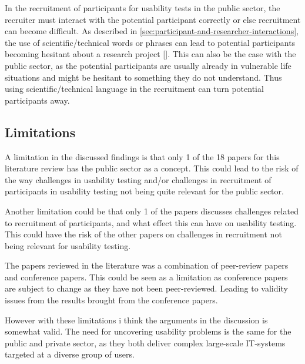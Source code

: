 In the recruitment of participants for usability tests in the public sector, the recruiter must interact with the potential participant correctly or else recruitment can become difficult. As described in \autoref{sec:participant-and-researcher-interactions}, the use of scientific/technical words or phrases can lead to potential participants becoming hesitant about a research project [\cite{pkf_2018}]. This can also be the case with the public sector, as the potential participants are usually already in vulnerable life situations and might be hesitant to something they do not understand. Thus using scientific/technical language in the recruitment can turn potential participants away.

\subsection{Limitations}
A limitation in the discussed findings is that only 1 of the 18 papers for this literature review has the public sector as a concept. This could lead to the risk of the way challenges in usability testing and/or challenges in recruitment of participants in usability testing not being quite relevant for the public sector. 

Another limitation could be that only 1 of the papers discusses challenges related to recruitment of participants, and what effect this can have on usability testing. This could have the risk of the other papers on challenges in recruitment not being relevant for usability testing.

The papers reviewed in the literature was a combination of peer-review papers and conference papers. This could be seen as a limitation as conference papers are subject to change as they have not been peer-reviewed. Leading to validity issues from the results brought from the conference papers.

However with these limitations i think the arguments in the discussion is somewhat valid. The need for uncovering usability problems is the same for the public and private sector, as they both deliver complex large-scale IT-systems targeted at a diverse group of users.